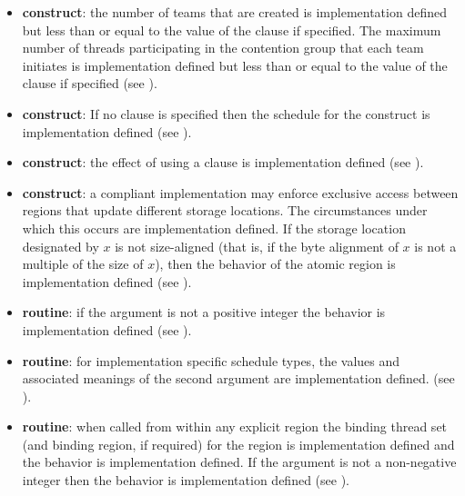 \begin{itemize}
\item {} \textbf{construct}: the number of teams that are created is implementation defined but 
less than or equal to the value of the  clause if specified. The maximum 
number of threads participating in the contention group that each team initiates is 
implementation defined but less than or equal to the value of the  
clause if specified (see ). 

\item {} \textbf{construct}: If no  clause is specified then the schedule for the  
construct is implementation defined (see ). 

\item {} \textbf{construct}: the effect of using a 
clause is implementation defined (see ). 

\item {} \textbf{construct}: a compliant implementation may enforce exclusive access 
between  regions that update different storage locations. The circumstances 
under which this occurs are implementation defined. If the storage location 
designated by $x$ is not size-aligned (that is, if the byte alignment of $x$ is not a multiple 
of the size of $x$), then the behavior of the atomic region is implementation defined 
(see ).

\item {} \textbf{routine}: if the argument is not a positive integer the 
behavior is implementation defined (see ).

\item {} \textbf{routine}: for implementation specific schedule types, the 
values and associated meanings of the second argument are implementation defined. 
(see ).

\item {} \textbf{routine}: when called from within any explicit 
 region the binding thread set (and binding region, if required) for the 
 region is implementation defined and the 
behavior is implementation defined. If the argument is not a non-negative integer 
then the behavior is implementation defined (see ).


\end{itemize}
